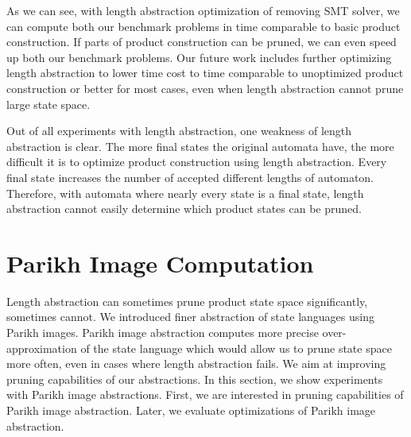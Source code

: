 As we can see, with length abstraction optimization of removing SMT solver, we can compute both our benchmark problems in time comparable to basic product construction. If parts of product construction can be pruned, we can even speed up both our benchmark problems. Our future work  includes further optimizing length abstraction to lower time cost to time comparable to unoptimized product construction or better for most cases, even when length abstraction cannot prune large state space.

Out of all experiments with length abstraction, one weakness of length abstraction is clear. The more final states the original automata have, the more difficult it is to optimize product construction using length abstraction. Every final state increases the number of accepted different lengths of automaton. Therefore, with automata where nearly every state is a final state, length abstraction cannot easily determine which product states can be pruned.

\section{Parikh Image Computation}

Length abstraction can sometimes prune product state space significantly, sometimes cannot. We introduced finer abstraction of state languages using Parikh images. Parikh image abstraction computes more precise over-approximation of the state language which would allow us to prune state space more often, even in cases where length abstraction fails. We aim at improving pruning capabilities of our abstractions. In this section, we show experiments with Parikh image abstractions. First, we are interested in pruning capabilities of Parikh image abstraction. Later, we evaluate optimizations of Parikh image abstraction.

